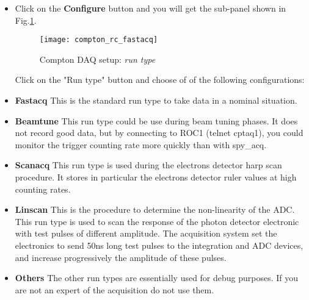 {\begin{itemize}
\item Click on the {\bf Configure} button and you will get the sub-panel shown in 
Fig.\ref{fig:compton_rc_fastacq}.
\begin{figure}[htp]
    \begin{center}
        \texttt{[image: compton\_rc\_fastacq]}
    \end{center}
    \caption[compton:runcontrol run type]{Compton DAQ setup: {\it run type} }
    \label{fig:compton_rc_fastacq}
\end{figure}
Click on the "Run type" button and choose of of the following configurations:

\item {\bf Fastacq}
This is the standard run type to take data in a nominal situation.
\item {\bf Beamtune} This run type could be use during beam tuning phases.
It does not record good data, but by connecting to ROC1 (telnet cptaq1),
you could monitor the trigger counting rate more quickly than with spy\_acq.

\item {\bf Scanacq} This run type is used during the electrons detector harp scan procedure.
It stores in particular the electrons detector ruler values at high counting
rates.
\item {\bf Linscan}
This is the procedure to determine the non-linearity of the ADC.
This run type is used to scan the response of the photon detector electronic
with test pulses of different amplitude. The acquisition system set the
electronics to send 50ns long test pulses to the integration and ADC devices,
and increase progressively the amplitude of these pulses.
\item {\bf Others}
The other run types are essentially used for debug purposes. If you are
not an expert of the acquisition do not use them.


\end{itemize}}

